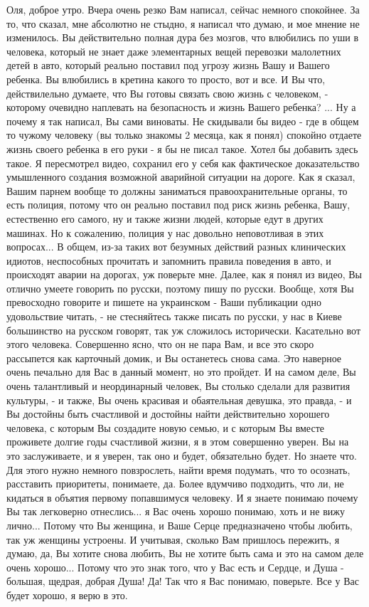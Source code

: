 Оля, доброе утро. Вчера очень резко Вам написал, сейчас немного спокойнее. За
то, что сказал, мне абсолютно не стыдно, я написал что думаю, и мое мнение не
изменилось. Вы действительно полная дура без мозгов, что влюбились по уши в человека,
который не знает даже элементарных вещей перевозки малолетних детей в авто, который реально поставил под угрозу жизнь Вашу и Вашего ребенка. Вы влюбились в 
кретина какого то просто, вот и все.
И Вы что, действилельно думаете, что Вы готовы связать свою жизнь с человеком, 
- которому очевидно наплевать на безопасность и жизнь Вашего ребенка? ... Ну а почему я
так написал, Вы сами виноваты. Не скидывали бы видео - где в общем то чужому
человеку (вы только знакомы 2 месяца, как я понял) спокойно отдаете жизнь
своего ребенка в его руки - я бы не писал такое. Хотел бы добавить здесь
такое.  Я пересмотрел видео, сохранил его у себя как фактическое доказательство
умышленного создания возможной аварийной ситуации на дороге.  Как я сказал,
Вашим парнем вообще то должны заниматься правоохранительные органы, то есть
полиция, потому что он реально поставил под риск жизнь ребенка, Вашу,
естественно его самого, ну и также жизни людей, которые едут в других машинах.
Но к сожалению, полиция у нас довольно неповотливая в этих вопросах... В общем,
из-за таких вот безумных действий разных клинических идиотов, неспособных
прочитать и запомнить правила поведения в авто, и происходят аварии на дорогах,
уж поверьте мне. Далее, как я понял из видео, Вы отлично умеете говорить по
русски, поэтому пишу по русски. Вообще, хотя Вы превосходно говорите и пишете на украинском - Ваши публикации одно удовольствие читать, - не стесняйтесь также писать по русски, у нас в Киеве большинство на русском говорят, так уж сложилось исторически. Касательно вот этого человека.  Совершенно
ясно, что он не пара Вам, и все это скоро рассыпется как карточный домик, и Вы
останетесь снова сама. Это наверное очень печально для Вас в данный момент, но
это пройдет. И на самом деле, Вы очень талантливый и неординарный человек, Вы столько сделали для развития культуры, - и также, Вы очень красивая и обаятельная девушка, это правда, - и
Вы достойны быть счастливой и достойны найти действительно хорошего человека, с
которым Вы создадите новую семью, и с которым Вы вместе проживете долгие годы
счастливой жизни, я в этом совершенно уверен. Вы на это заслуживаете, и я
уверен, так оно и будет, обязательно будет. Но знаете что.  Для этого нужно
немного повзрослеть, найти время подумать, что то осознать, расставить
приоритеты, понимаете, да. Более вдумчиво подходить, что ли, не кидаться в
объятия первому попавшимуся человеку. И я знаете понимаю почему Вы так легковерно
отнеслись... я Вас очень хорошо понимаю, хоть и не вижу лично...  Потому что Вы
женщина, и Ваше Серце предназначено чтобы любить, так уж женщины устроены. И
учитывая, сколько Вам пришлось пережить, я думаю, да, Вы хотите снова любить,
Вы не хотите быть сама и это на самом деле очень хорошо... Потому что это знак
того, что у Вас есть и Сердце, и Душа - большая, щедрая, добрая Душа! Да! Так
что я Вас понимаю, поверьте.  Все у Вас будет хорошо, я верю в это.

